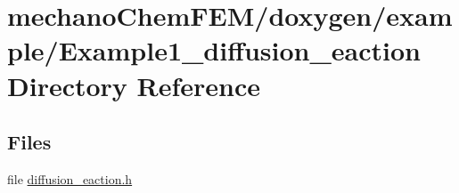 \section{mechano\-Chem\-F\-E\-M/doxygen/example/\-Example1\-\_\-diffusion\-\_\-eaction Directory Reference}
\label{dir_f4be6f7453f67daf00c127cd2ee588d2}
\subsection*{Files}
\begin{DoxyCompactItemize}
\item 
file \hyperlink{diffusion__eaction_8h}{diffusion\-\_\-eaction.\-h}
\end{DoxyCompactItemize}

